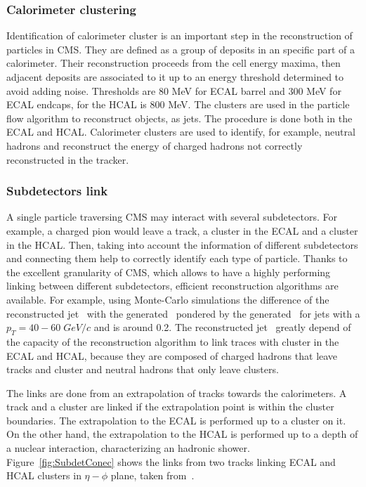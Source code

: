 \subsubsection{Calorimeter clustering}

Identification of calorimeter cluster is an important step in the reconstruction of particles in CMS. They are defined as a group of deposits in an specific part of a calorimeter. Their reconstruction proceeds from the cell energy maxima, then adjacent deposits are associated to it up to an energy threshold determined to avoid adding noise. Thresholds are 80 MeV for ECAL barrel and 300 MeV for ECAL endcaps, for the HCAL is 800 MeV. The clusters are used in the particle flow algorithm to reconstruct objects, as jets. The procedure is done both in the ECAL and HCAL. Calorimeter clusters are used to identify, for example, neutral hadrons and reconstruct the energy of charged hadrons not correctly reconstructed in the tracker.    

\subsubsection{Subdetectors link}

A single particle traversing CMS may interact with several subdetectors. For example, a charged pion would leave a track, a cluster in the ECAL and a cluster in the HCAL. Then, taking into account the information of different subdetectors and connecting them help to correctly identify each type of particle. Thanks to the excellent granularity of CMS, which allows to have a highly performing linking between different subdetectors, efficient reconstruction algorithms are available. For example, using Monte-Carlo simulations the difference of the reconstructed jet \pt~with the generated \pt~pondered by the generated \pt~for jets with a ${p_{T}=40-60\;GeV/c}$ and  is around 0.2. The reconstructed jet \pt~greatly depend of the capacity of the reconstruction algorithm to link traces with cluster in the ECAL and HCAL, because they are composed of charged hadrons that leave tracks and cluster and neutral hadrons that only leave clusters.

The links are done from an extrapolation of tracks towards the calorimeters. A track and a cluster are linked if the extrapolation point is within the cluster boundaries. The extrapolation to the ECAL is performed up to a cluster on it. On the other hand, the extrapolation to the HCAL is performed up to a  depth of a nuclear interaction, characterizing an hadronic shower. Figure~\ref{fig:SubdetConec} shows the links from two tracks linking ECAL and HCAL clusters in $\eta-\phi$ plane, taken from~\cite{Brochet:1956723}. %

